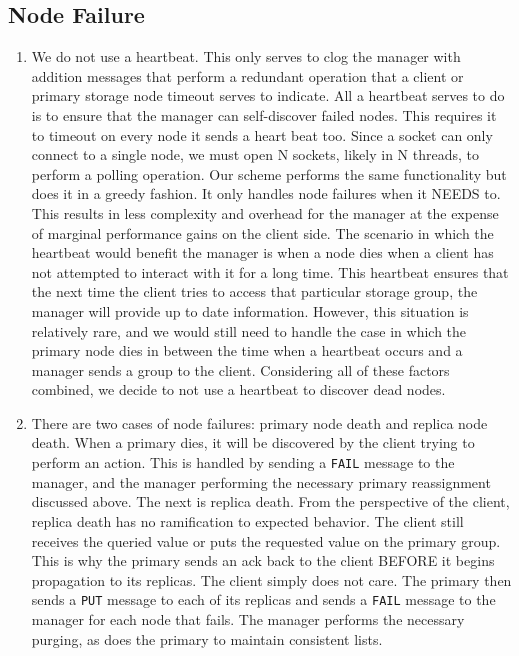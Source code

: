 \documentclass{article}
\begin{document}
\subsection{Node Failure}
\begin{enumerate}
    \item We do not use a heartbeat. This only serves to clog the manager with addition messages that perform a redundant operation that a client or primary storage node timeout
    serves to indicate. All a heartbeat serves to do is to ensure that the manager can self-discover failed nodes. This requires it to timeout on every node it sends a heart beat too.
    Since a socket can only connect to a single node, we must open N sockets, likely in N threads, to perform a polling operation. Our scheme performs the same functionality but does it
    in a greedy fashion. It only handles node failures when it NEEDS to. This results in less complexity and overhead for the manager at the expense of marginal performance gains on the 
    client side. The scenario in which the heartbeat would benefit the manager is when a node dies when a client has not attempted to interact with it for a long time. This heartbeat 
    ensures that the next time the client tries to access that particular storage group, the manager will provide up to date information. However, this situation is relatively rare, and 
    we would still need to handle the case in which the primary node dies in between the time when a heartbeat occurs and a manager sends a group to the client. Considering all of these factors
    combined, we decide to not use a heartbeat to discover dead nodes. 
    \item There are two cases of node failures: primary node death and replica node death. When a primary dies, it will be discovered by the client trying to perform an action. This is 
    handled by sending a \texttt{FAIL} message to the manager, and the manager performing the necessary primary reassignment discussed above. The next is replica death. From the perspective
    of the client, replica death has no ramification to expected behavior. The client still receives the queried value or puts the requested value on the primary group. This is why
    the primary sends an ack back to the client BEFORE it begins propagation to its replicas. The client simply does not care. The primary then sends a \texttt{PUT} message to each of 
    its replicas and sends a \texttt{FAIL} message to the manager for each node that fails. The manager performs the necessary purging, as does the primary to maintain consistent lists.
\end{enumerate}
\end{document}
